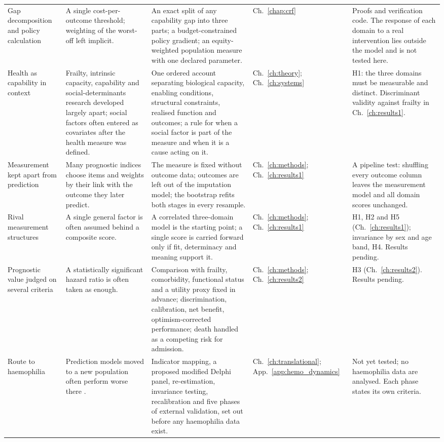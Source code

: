\begin{longtable}{>{\raggedright\arraybackslash}p{2.4cm} >{\raggedright\arraybackslash}p{3.0cm} >{\raggedright\arraybackslash}p{3.6cm} >{\raggedright\arraybackslash}p{1.4cm} >{\raggedright\arraybackslash}p{3.7cm}}
\addlinespace
Gap decomposition and policy calculation & A single cost-per-outcome threshold; weighting of the worst-off left implicit. & An exact split of any capability gap into three parts; a budget-constrained policy gradient; an equity-weighted population measure with one declared parameter. & Ch.~\ref{chap:crf} & Proofs and verification code. The response of each domain to a real intervention lies outside the model and is not tested here. \\
\addlinespace
Health as capability in context & Frailty, intrinsic capacity, capability and social-determinants research developed largely apart; social factors often entered as covariates after the health measure was defined. & One ordered account separating biological capacity, enabling conditions, structural constraints, realised function and outcomes; a rule for when a social factor is part of the measure and when it is a cause acting on it. & Ch.~\ref{ch:theory}; Ch.~\ref{ch:systems} & H1: the three domains must be measurable and distinct. Discriminant validity against frailty in Ch.~\ref{ch:results1}. \\
\addlinespace
Measurement kept apart from prediction & Many prognostic indices choose items and weights by their link with the outcome they later predict. & The measure is fixed without outcome data; outcomes are left out of the imputation model; the bootstrap refits both stages in every resample. & Ch.~\ref{ch:methods}; Ch.~\ref{ch:results1} & A pipeline test: shuffling every outcome column leaves the measurement model and all domain scores unchanged. \\
\addlinespace
Rival measurement structures & A single general factor is often assumed behind a composite score. & A correlated three-domain model is the starting point; a single score is carried forward only if fit, determinacy and meaning support it. & Ch.~\ref{ch:methods}; Ch.~\ref{ch:results1} & H1, H2 and H5 (Ch.~\ref{ch:results1}); invariance by sex and age band, H4. Results pending. \\
\addlinespace
Prognostic value judged on several criteria & A statistically significant hazard ratio is often taken as enough. & Comparison with frailty, comorbidity, functional status and a utility proxy fixed in advance; discrimination, calibration, net benefit, optimism-corrected performance; death handled as a competing risk for admission. & Ch.~\ref{ch:methods}; Ch.~\ref{ch:results2} & H3 (Ch.~\ref{ch:results2}). Results pending. \\
\addlinespace
Route to haemophilia & Prediction models moved to a new population often perform worse there \citep{moons_2019,collins_2024}. & Indicator mapping, a proposed modified Delphi panel, re-estimation, invariance testing, recalibration and five phases of external validation, set out before any haemophilia data exist. & Ch.~\ref{ch:translational}; App.~\ref{app:hemo_dynamics} & Not yet tested; no haemophilia data are analysed. Each phase states its own criteria. \\

\end{longtable}
